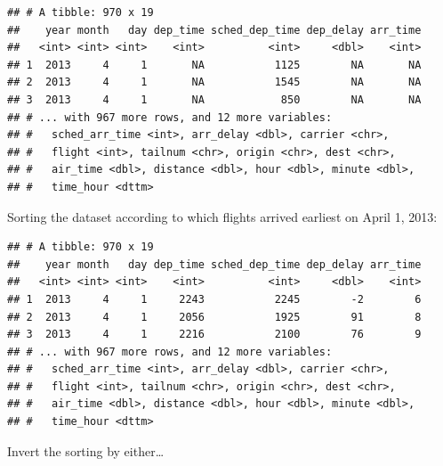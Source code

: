 \documentclass[]{book}
\newenvironment{Shaded}{}{}
\newcommand{\DecValTok}[1]{#1}
\newcommand{\KeywordTok}[1]{\textcolor[rgb]{0.00,0.00,1.00}{#1}}
\newcommand{\NormalTok}[1]{#1}
\newcommand{\OperatorTok}[1]{#1}
\newcommand{\StringTok}[1]{\textcolor[rgb]{0.00,0.50,0.50}{#1}}
\begin{document}
\begin{verbatim}
## # A tibble: 970 x 19
##    year month   day dep_time sched_dep_time dep_delay arr_time
##   <int> <int> <int>    <int>          <int>     <dbl>    <int>
## 1  2013     4     1       NA           1125        NA       NA
## 2  2013     4     1       NA           1545        NA       NA
## 3  2013     4     1       NA            850        NA       NA
## # ... with 967 more rows, and 12 more variables:
## #   sched_arr_time <int>, arr_delay <dbl>, carrier <chr>,
## #   flight <int>, tailnum <chr>, origin <chr>, dest <chr>,
## #   air_time <dbl>, distance <dbl>, hour <dbl>, minute <dbl>,
## #   time_hour <dttm>
\end{verbatim}

Sorting the dataset according to which flights arrived earliest on April 1, 2013:

\begin{Shaded}
\end{Shaded}

\begin{verbatim}
## # A tibble: 970 x 19
##    year month   day dep_time sched_dep_time dep_delay arr_time
##   <int> <int> <int>    <int>          <int>     <dbl>    <int>
## 1  2013     4     1     2243           2245        -2        6
## 2  2013     4     1     2056           1925        91        8
## 3  2013     4     1     2216           2100        76        9
## # ... with 967 more rows, and 12 more variables:
## #   sched_arr_time <int>, arr_delay <dbl>, carrier <chr>,
## #   flight <int>, tailnum <chr>, origin <chr>, dest <chr>,
## #   air_time <dbl>, distance <dbl>, hour <dbl>, minute <dbl>,
## #   time_hour <dttm>
\end{verbatim}

Invert the sorting by either\ldots{}

\begin{Shaded}
\end{Shaded}
\end{document}
